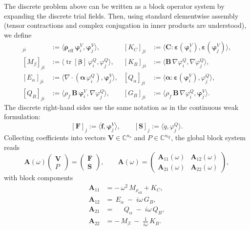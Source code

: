 \documentclass[pdflatex,sn-mathphys-num]{sn-jnl}
\theoremstyle{thmstyleone}%
\theoremstyle{thmstyletwo}%
\theoremstyle{thmstylethree}%
\def \div {\nabla\cdot}
\theoremstyle{definition}
\begin{document}
	The discrete problem above can be written as a block operator system by expanding the discrete trial fields. %
	Then, using standard elementwise assembly (tensor contractions and complex conjugation in inner products are understood), we define
	\begin{align*}
		[M_{\rho_{\mathrm{eff}}}]_{j i} &:= \langle \boldsymbol{\rho}_{\mathrm{eff}}\, \boldsymbol{\varphi}_i^V, \boldsymbol{\varphi}_j^V \rangle, 
		&
		[K_C]_{j i} &:= \langle \mathbf{C} : \boldsymbol{\varepsilon}(\boldsymbol{\varphi}_i^V), \boldsymbol{\varepsilon}(\boldsymbol{\varphi}_j^V) \rangle, \\[2pt]
		[M_\beta]_{j i} &:= \langle \operatorname{tr}[\boldsymbol{\beta}]\, \varphi_i^Q, \varphi_j^Q \rangle, 
		&
		[K_B]_{j i} &:= \langle \mathbf{B}\, \nabla \varphi_i^Q, \nabla \varphi_j^Q \rangle, \\[2pt]
		[E_\alpha]_{j i} &:= \langle \div(\boldsymbol{\alpha}\, \varphi_i^Q), \boldsymbol{\varphi}_j^V \rangle, 
		&
		[Q_\alpha]_{j i} &:= \langle \boldsymbol{\alpha}: \boldsymbol{\varepsilon}(\boldsymbol{\varphi}_i^V) ,  \varphi_j^Q \rangle, \\[2pt]
		[Q_B]_{j i} &:= \langle \rho_f\, \mathbf{B}\, \boldsymbol{\varphi}_i^V, \nabla \varphi_j^Q \rangle,
		&
		[G_B]_{j i} &:= \langle \rho_f\, \mathbf{B}\, \nabla \varphi_i^Q, \boldsymbol{\varphi}_j^V \rangle.
	\end{align*}
	The discrete right-hand sides use the same notation as in the continuous weak formulation:
	\[
	[\mathbf{F}]_j := \langle \dot{\mathbf{f}}, \boldsymbol{\varphi}_j^V \rangle,
	\qquad
	[\mathbf{S}]_j := \langle \dot{q}, \varphi_j^Q \rangle.
	\]
	Collecting coefficients into vectors $\mathbf{V} \in \mathbb{C}^{n_v}$ and $P \in \mathbb{C}^{n_Q}$, the global block system reads
	\[
	\mathbf{A}(\omega)
	\begin{pmatrix}
		\mathbf{V} \\
		P
	\end{pmatrix}
	=
	\begin{pmatrix}
		\mathbf{F} \\
		\mathbf{S}
	\end{pmatrix},
	\qquad
	\mathbf{A}(\omega) =
	\begin{pmatrix}
		\mathbf{A}_{11}(\omega) & \mathbf{A}_{12}(\omega) \\
		\mathbf{A}_{21}(\omega) & \mathbf{A}_{22}(\omega)
	\end{pmatrix},
	\]
	with block components
	\[
	\begin{aligned}
		\mathbf{A}_{11} &= -\,\omega^2\, M_{\rho_{\mathrm{eff}}} + K_C, \\
		\mathbf{A}_{12} &= \,E_\alpha \;-\; i\omega\, G_B,\\
		\mathbf{A}_{21} &= \phantom{-}\,Q_\alpha \;-\; i\omega\, Q_B, \\
		\mathbf{A}_{22} &= -\,M_\beta \;-\; \tfrac{1}{i\omega}\, K_B.
	\end{aligned}
	\]
	
\end{document}
